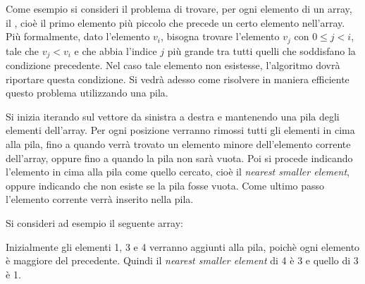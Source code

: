 Come esempio si consideri il problema 
di trovare, per ogni elemento di un array,
il , cioè
il primo elemento più piccolo che precede 
un certo elemento nell'array. Più formalmente,
dato l'elemento $v_{i}$, bisogna trovare l'elemento
$v_{j}$ con $0 \leq j<i$, tale che $v_{j} < v_{i}$ e che abbia l'indice $j$
più grande tra tutti quelli che soddisfano la condizione precedente.
Nel caso tale elemento non esistesse,
l'algoritmo dovrà riportare questa condizione.
Si vedrà adesso come risolvere in maniera
efficiente questo problema utilizzando una pila.

Si inizia iterando sul vettore da sinistra a destra
e mantenendo una pila degli elementi dell'array.
Per ogni posizione verranno rimossi tutti gli elementi
in cima alla pila, fino a quando verrà trovato un
elemento minore dell'elemento corrente dell'array,
oppure fino a quando la pila non sarà vuota.
Poi si procede indicando l'elemento in cima alla
pila come quello cercato, cioè il \emph{nearest smaller element},
oppure indicando che non esiste se la pila fosse vuota.
Come ultimo passo l'elemento corrente verrà inserito nella pila. 

Si consideri ad esempio il seguente array:
\begin{center}
\end{center}

Inizialmente gli elementi 1, 3 e 4 verranno aggiunti alla pila,
poichè ogni elemento è maggiore del precedente.
Quindi il \emph{nearest smaller element} di 4 è 3 e quello di 3 è 1.
\begin{center}
\end{center}

